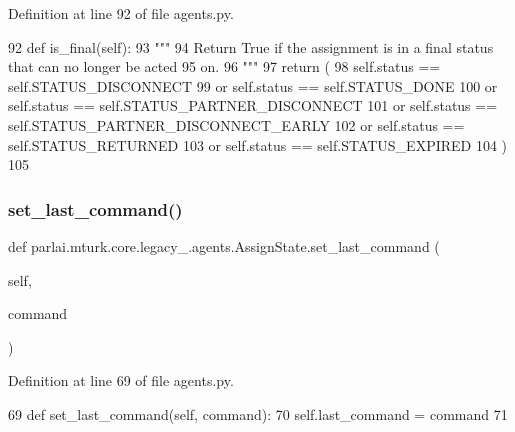 Definition at line 92 of file agents.\+py.


\begin{DoxyCode}
92     \textcolor{keyword}{def }is\_final(self):
93         \textcolor{stringliteral}{"""}
94 \textcolor{stringliteral}{        Return True if the assignment is in a final status that can no longer be acted}
95 \textcolor{stringliteral}{        on.}
96 \textcolor{stringliteral}{        """}
97         \textcolor{keywordflow}{return} (
98             self.status == self.STATUS\_DISCONNECT
99             \textcolor{keywordflow}{or} self.status == self.STATUS\_DONE
100             \textcolor{keywordflow}{or} self.status == self.STATUS\_PARTNER\_DISCONNECT
101             \textcolor{keywordflow}{or} self.status == self.STATUS\_PARTNER\_DISCONNECT\_EARLY
102             \textcolor{keywordflow}{or} self.status == self.STATUS\_RETURNED
103             \textcolor{keywordflow}{or} self.status == self.STATUS\_EXPIRED
104         )
105 
\end{DoxyCode}
\mbox{\label{classparlai_1_1mturk_1_1core_1_1legacy__2018_1_1agents_1_1AssignState_a2aae5b36e3da9791dbb1c5677aa5e24d}} 
\subsubsection{\texorpdfstring{set\+\_\+last\+\_\+command()}{set\_last\_command()}}
{\footnotesize\ttfamily def parlai.\+mturk.\+core.\+legacy\+\_.\+agents.\+Assign\+State.\+set\+\_\+last\+\_\+command (\begin{DoxyParamCaption}\item[{}]{self,  }\item[{}]{command }\end{DoxyParamCaption})}



Definition at line 69 of file agents.\+py.


\begin{DoxyCode}
69     \textcolor{keyword}{def }set\_last\_command(self, command):
70         self.last\_command = command
71 
\end{DoxyCode}
\mbox{\label{classparlai_1_1mturk_1_1core_1_1legacy__2018_1_1agents_1_1AssignState_a27ffbfa35ca00b8db0d0062aa476a65c}} 
